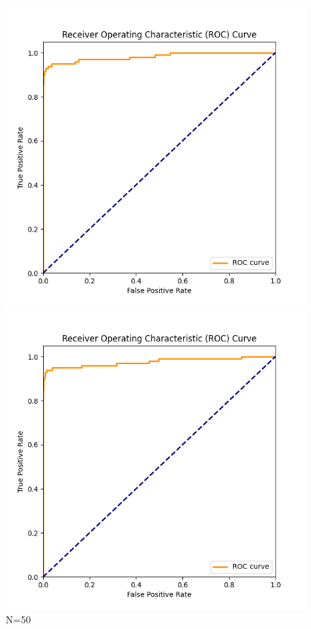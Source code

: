 \documentclass[8pt]{article}
\begin{document}
\begin{figure}[H]
    \centering
    \begin{minipage}{0.31\textwidth}
        \centering
        \includegraphics[width=\textwidth]{../Prob1/out/rand_seed_14/task3/roc_curve_N_50_K_7.png}
        \caption{N=50}
        \label{fig:roc_curve_N_50_K_7}
    \end{minipage}
    \begin{minipage}{0.31\textwidth}
        \centering
        \includegraphics[width=\textwidth]{../Prob1/out/rand_seed_14/task3/roc_curve_N_100_K_7.png}

\end{minipage}
\end{figure}
\end{document}
